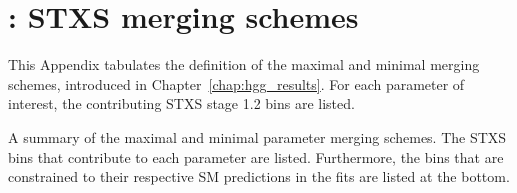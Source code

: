 \chapter{\Hgg: STXS merging schemes}\label{app:merging_table}
This Appendix tabulates the definition of the maximal and minimal merging schemes, introduced in Chapter~\ref{chap:hgg_results}. For each parameter of interest, the contributing STXS stage 1.2 bins are listed. 

\begin{table}[htbp]
  \centering
  \scriptsize
  \renewcommand{\arraystretch}{1.1}
  \setlength{\tabcolsep}{2.2pt}
  \caption[Summary of the maximal and minimal parameter merging schemes]
  {
    A summary of the maximal and minimal parameter merging schemes. 
    The STXS bins that contribute to each parameter are listed. 
    Furthermore, the bins that are constrained to their respective SM predictions 
    in the fits are listed at the bottom.
  }
  \label{tab:merging_schemes}
  \hspace*{-1cm}
  
  \hspace*{-1cm}
\end{table}